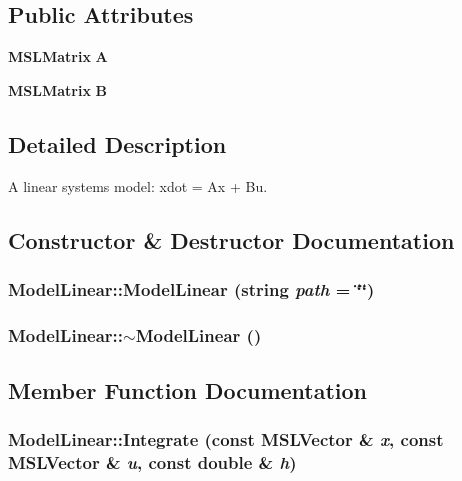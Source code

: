 \subsection*{Public Attributes}
\begin{CompactItemize}
\item 
{\bf MSLMatrix} {\bf A}
\item 
{\bf MSLMatrix} {\bf B}
\end{CompactItemize}


\subsection{Detailed Description}
A linear systems model: xdot = Ax + Bu.



\subsection{Constructor \& Destructor Documentation}
\subsubsection{\setlength{\rightskip}{0pt plus 5cm}Model\-Linear::Model\-Linear (string {\em path} = \char`\"{}\char`\"{})}\label{classModelLinear_a0}


\subsubsection{\setlength{\rightskip}{0pt plus 5cm}Model\-Linear::$\sim$Model\-Linear ()\hspace{0.3cm}{\tt  [inline, virtual]}}\label{classModelLinear_a1}




\subsection{Member Function Documentation}
\subsubsection{ Model\-Linear::Integrate (const {\bf MSLVector} \& {\em x}, const {\bf MSLVector} \& {\em u}, const double \& {\em h})\hspace{0.3cm}{\tt  [virtual]}}\label{classModelLinear_a3}


